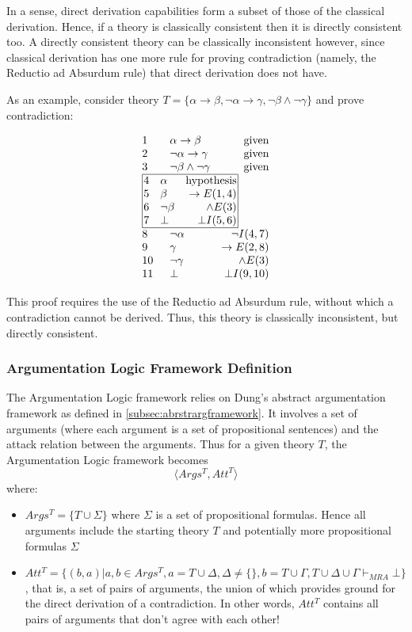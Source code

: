 \documentclass[11pt,twoside,a4paper]{report}
\begin{document}
In a sense, direct derivation capabilities form a subset of those of the classical derivation. Hence, if a theory is classically consistent then it is directly consistent too. A directly consistent theory can be classically inconsistent however, since classical derivation has one more rule for proving contradiction (namely, the Reductio ad Absurdum rule) that direct derivation does not have.

As an example, consider theory $T = \{\alpha\rightarrow\beta, \neg\alpha\rightarrow\gamma, \neg\beta\wedge\neg\gamma\}$ and prove contradiction:

\[\vbox{\offinterlineskip\halign{
&\tabskip=1.5em#\strut&$#$\hfil\tabskip=1em&\hfil$#$\tabskip=0em\cr
%
1&\alpha\rightarrow\beta&\mbox{given}\cr
2&\neg\alpha\rightarrow\gamma&\mbox{given}\cr
3&\neg\beta\wedge\neg\gamma&\mbox{given}\cr
%
\multispan3\vbox{\halign{
\vrule#&&\hskip.1em\tabskip=1em#\strut&$#$\hfil\tabskip=1em&\hfil$#$\hskip0.1em\tabskip=0em&\vrule#\cr
\noalign{\hrule}
%
&4&\alpha&\mbox{hypothesis}&\cr
&5&\beta&\rightarrow E(1,4)&\cr
&6&\neg\beta&\wedge E(3)&\cr
&7&\bot&\bot I(5,6)&\cr
%
\noalign{\hrule}}}\,\cr
%
8&\neg\alpha&\neg I(4,7)\cr
9&\gamma&\rightarrow E(2,8)\cr
10&\neg\gamma&\wedge E(3)\cr
11&\bot&\bot I(9,10)\cr
}}\]

This proof requires the use of the Reductio ad Absurdum rule, without which a contradiction cannot be derived. Thus, this theory is classically inconsistent, but directly consistent.

\subsubsection{Argumentation Logic Framework Definition}
\label{subsec:alfdef}
The Argumentation Logic framework relies on Dung's abstract argumentation framework as defined in \autoref{subsec:abrstrargframework}. It involves a set of arguments (where each argument is a set of propositional sentences) and the attack relation between the arguments. Thus for a given theory $T$, the Argumentation Logic framework becomes
\[\langle Args^T, Att^T\rangle\]
where:
\begin{itemize}
\item
$Args^T = \{T\cup\Sigma\}$ where $\Sigma$ is a set of propositional formulas. Hence all arguments include the starting theory $T$ and potentially more propositional formulas $\Sigma$
\item
$Att^T = \{(b,a) | a,b \in Args^T, a = T\cup\Delta, \Delta\neq\{\}, b = T\cup\Gamma, T\cup\Delta\cup\Gamma\vdash_{MRA}\bot\}$, that is, a set of pairs of arguments, the union of which provides ground for the direct derivation of a contradiction. In other words, $Att^T$ contains all pairs of arguments that don't agree with each other!
\end{itemize}
\end{document}
